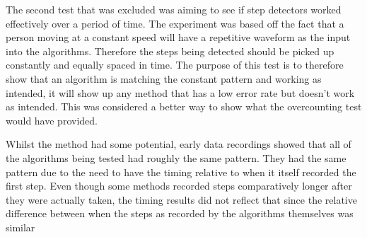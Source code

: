 \documentclass[main.tex]{subfiles}
\begin{document}
The second test that was excluded was aiming to see if step detectors worked effectively over a period of time. The experiment was based off the fact that a person moving at a constant speed will have a repetitive waveform as the input into the algorithms. Therefore the steps being detected should be picked up constantly and equally spaced in time. The purpose of this test is to therefore show that an algorithm is matching the constant pattern and working as intended, it will show up any method that has a low error rate but doesn't work as intended. This was considered a better way to show what the overcounting test would have provided.

Whilst the method had some potential, early data recordings showed that all of the algorithms being tested had roughly the same pattern. They had the same pattern due to the need to have the timing relative to when it itself recorded the first step. Even though some methods recorded steps comparatively longer after they were actually taken, the timing results did not reflect that since the relative difference between when the steps as recorded by the algorithms themselves was similar
\end{document}
